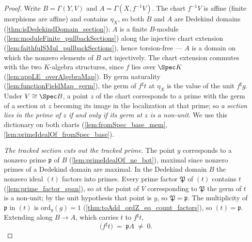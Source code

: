 \begin{proof}
  \leanok
  Write \(B = \Gamma(Y, V)\) and \(A = \Gamma(X, f^{-1}V)\). The chart \(f^{-1}V\) is
  affine (finite morphisms are affine) and contains \(\eta_X\), so both \(B\) and \(A\)
  are Dedekind domains (\ref{thm:isDedekindDomain_section}); \(A\) is a finite
  \(B\)-module (\ref{lem:moduleFinite_pullbackSections}) along the injective chart
  extension (\ref{lem:faithfulSMul_pullbackSections}), hence torsion-free --- \(A\) is
  a domain on which the nonzero elements of \(B\) act injectively. The chart extension
  commutes with the two \(K\)-algebra structures, since \(f\) lies over \(\Spec K\)
  (\ref{lem:appLE_overAlgebraMap}). By germ naturality
  (\ref{lem:functionFieldMap_germ}), the germ of \(f^{\sharp}t\) at \(\eta_X\) is the
  value of the unit \(f^{\sharp}g\). Under \(V \cong \Spec B\), a point \(z\) of the
  chart corresponds to a prime with the germ of a section at \(z\) becoming its image
  in the localization at that prime; so \emph{a section lies in the prime of \(z\) if
  and only if its germ at \(z\) is a non-unit}. We use this dictionary on both charts
  (\ref{lem:fromSpec_base_mem}, \ref{lem:primeIdealOf_fromSpec_base}).

  \emph{The tracked section cuts out the tracked prime.} The point \(y\) corresponds
  to a nonzero prime \(\mathfrak p\) of \(B\) (\ref{lem:primeIdealOf_ne_bot}), maximal
  since nonzero primes of a Dedekind domain are maximal. In the Dedekind domain \(B\)
  the nonzero ideal \((t)\) factors into primes. Every prime factor \(\mathfrak P\) of
  \((t)\) contains \(t\) (\ref{lem:prime_factor_span}), so at the point of \(V\)
  corresponding to \(\mathfrak P\) the germ of \(t\) is a non-unit; by the unit
  hypothesis that point is \(y\), so \(\mathfrak P = \mathfrak p\). The multiplicity
  of \(\mathfrak p\) in \((t)\) is \(\mathrm{ord}_y(g) = 1\)
  (\ref{thm:toAdd_ordZ_eq_count_factors}), so \((t) = \mathfrak p\). Extending along
  \(B \to A\), which carries \(t\) to \(f^{\sharp}t\),
  \[
    \bigl(f^{\sharp}t\bigr) \;=\; \mathfrak p A \;\neq\; 0 .
  \]


\end{proof}
